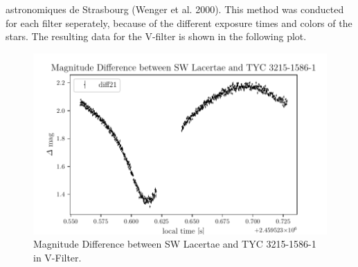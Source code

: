   astronomiques de Strasbourg (Wenger et al. 2000).
  This method was conducted for each filter seperately, because of the different 
  exposure times and colors of the stars.
  The resulting data for the V-filter is shown in the following plot.
  \begin{figure}[H]
    \centering
    \includegraphics{V-Filter.pdf}
    \caption{Magnitude Difference between SW Lacertae and TYC 3215-1586-1 in V-Filter.}
    \label{fig:plot}
  \end{figure}

